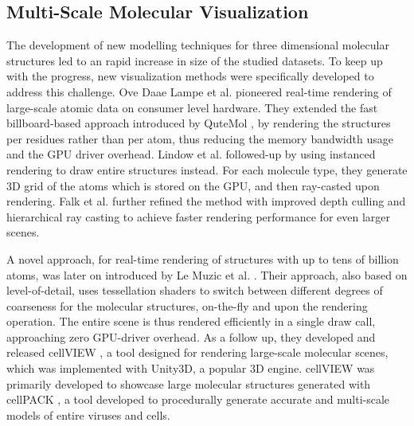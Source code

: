 \documentclass[review,journal]{vgtc}         %
\begin{document}
\subsection{Multi-Scale Molecular Visualization}

The development of new modelling techniques for three dimensional molecular structures led to an rapid increase in size of the studied datasets.
To keep up with the progress, new visualization methods were specifically developed to address this challenge.
Ove Daae Lampe et al.\cite{lampe2007two} pioneered real-time rendering of large-scale atomic data on consumer level hardware. 
They extended the fast billboard-based approach introduced by QuteMol \cite{tarini2006ambient}, by rendering the structures per residues rather than per atom, thus reducing the memory bandwidth usage and the GPU driver overhead. 
Lindow et al. \cite{lindow2012interactive} followed-up by using  instanced rendering to draw entire structures instead.
For each molecule type, they generate 3D grid of the atoms which is stored on the GPU, and then ray-casted upon rendering.
Falk et al. \cite{falk2013atomistic} further refined the method with improved depth culling and hierarchical ray casting to achieve faster rendering performance for even larger scenes. 


A novel approach, for real-time rendering of structures with up to tens of billion atoms, was later on introduced by Le Muzic et al. \cite{le2014illustrative}. 
Their approach, also based on level-of-detail, uses tessellation shaders to switch between different degrees of coarseness for the molecular structures, on-the-fly and upon the rendering operation.
The entire scene is thus rendered efficiently in a single draw call, approaching zero GPU-driver overhead. 
As a follow up, they developed and released cellVIEW \cite{muzic2015cellview}, a tool designed for rendering large-scale molecular scenes, which was implemented with Unity3D, a popular 3D engine.
cellVIEW was primarily developed to showcase large molecular structures generated with cellPACK \cite{johnson2015cellpack}, a tool developed to procedurally generate accurate and multi-scale models of entire viruses and cells.
\end{document}
